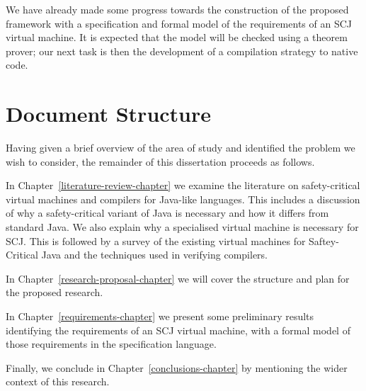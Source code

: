 \documentclass[a4paper,10pt]{report}
\begin{document}
We have already made some progress towards the construction of the proposed
framework with a specification and formal model of the requirements of an SCJ
virtual machine.  It is expected that the model will be checked using a theorem
prover; our next task is then the development of a compilation strategy to
native code.

\section{Document Structure}

Having given a brief overview of the area of study and identified the problem we
wish to consider, the remainder of this dissertation proceeds as follows.

In Chapter~\ref{literature-review-chapter} we examine the literature on
safety-critical virtual machines and compilers for Java-like languages. This
includes a discussion of why a safety-critical variant of Java is necessary and
how it differs from standard Java.  We also explain why a specialised virtual
machine is necessary for SCJ.  This is followed by a survey of the existing
virtual machines for Saftey-Critical Java and the techniques used in verifying
compilers.

In Chapter~\ref{research-proposal-chapter} we will cover the structure and
plan for the proposed research.

In Chapter~\ref{requirements-chapter} we present some preliminary results
identifying the requirements of an SCJ virtual machine, with a formal model of
those requirements in the \Circus{} specification language.

Finally, we conclude in Chapter~\ref{conclusions-chapter} by mentioning the
wider context of this research.

\end{document}
